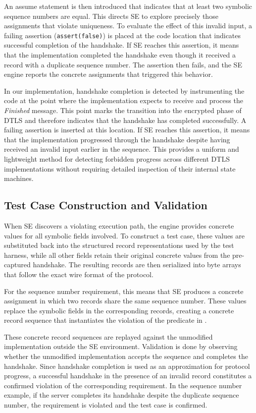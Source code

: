 An assume statement is then introduced that indicates that at least two symbolic sequence numbers are equal.
This directs SE to explore precisely those assignments that violate uniqueness.
To evaluate the effect of this invalid input, a failing assertion (\eg \texttt{assert(false)}) is placed at the code location that indicates successful completion of the handshake. 
If SE reaches this assertion, it means that the implementation completed the handshake even though it received a record with a duplicate sequence number. 
The assertion then fails, and the SE engine reports the concrete assignments that triggered this behavior.

In our implementation, handshake completion is detected by instrumenting the code at the point where the implementation expects to receive and process the \emph{Finished} message. 
This point marks the transition into the encrypted phase of DTLS and therefore indicates that the handshake has completed successfully. 
A failing assertion is inserted at this location. 
If SE reaches this assertion, it means that the implementation progressed through the handshake despite having received an invalid input earlier in the sequence. 
This provides a uniform and lightweight method for detecting forbidden progress across different DTLS implementations without requiring detailed inspection of their internal state machines.
\subsection{Test Case Construction and Validation}
When SE discovers a violating execution path, the engine provides concrete values for all symbolic fields involved.
To construct a test case, these values are substituted back into the structured record representations used by the test harness, while all other fields retain their original concrete values from the pre-captured handshake.
The resulting records are then serialized into byte arrays that follow the exact wire format of the protocol.

For the sequence number requirement, this means that SE produces a concrete assignment in which two records share the same sequence number. 
These values replace the symbolic fields in the corresponding records, creating a concrete record sequence that instantiates the violation of the predicate in .

These concrete record sequences are replayed against the unmodified implementation outside the SE environment.
Validation is done by observing whether the unmodified implementation accepts the sequence and completes the handshake.
Since handshake completion is used as an approximation for protocol progress, a successful handshake in the presence of an invalid record constitutes a confirmed violation of the corresponding requirement.
In the sequence number example, if the server completes its handshake despite the duplicate sequence number, the requirement is violated and the test case is confirmed.

